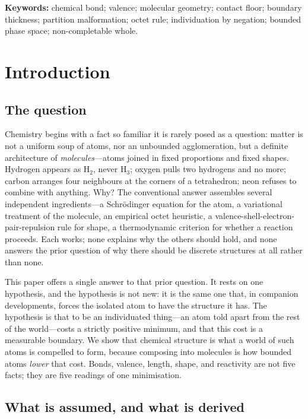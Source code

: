 \documentclass[11pt,twocolumn,a4paper]{article}
\theoremstyle{thmstyle}
\theoremstyle{definition}
\theoremstyle{remark}
\begin{document}
\noindent\textbf{Keywords:} chemical bond; valence; molecular geometry;
contact floor; boundary thickness; partition malformation; octet rule;
individuation by negation; bounded phase space; non-completable whole.

\tableofcontents

\section{Introduction}
\label{sec:intro}

\subsection{The question}

Chemistry begins with a fact so familiar it is rarely posed as a
question: matter is not a uniform soup of atoms, nor an unbounded
agglomeration, but a definite architecture of \emph{molecules}---atoms
joined in fixed proportions and fixed shapes. Hydrogen appears as
H$_2$, never H$_3$; oxygen pulls two hydrogens and no more; carbon
arranges four neighbours at the corners of a tetrahedron; neon refuses
to combine with anything. Why? The conventional answer assembles several
independent ingredients---a Schr\"odinger equation for the atom, a
variational treatment of the molecule, an empirical octet heuristic, a
valence-shell-electron-pair-repulsion rule for shape, a thermodynamic
criterion for whether a reaction proceeds. Each works; none explains why
the others should hold, and none answers the prior question of why there
should be discrete structures at all rather than none.

This paper offers a single answer to that prior question. It rests on
one hypothesis, and the hypothesis is not new: it is the same one that,
in companion developments, forces the isolated atom to have the
structure it has. The hypothesis is that to be an individuated
thing---an atom told apart from the rest of the world---costs a strictly
positive minimum, and that this cost is a measurable boundary. We show
that chemical structure is what a world of such atoms is compelled to
form, because composing into molecules is how bounded atoms
\emph{lower} that cost. Bonds, valence, length, shape, and reactivity
are not five facts; they are five readings of one minimisation.

\subsection{What is assumed, and what is derived}
\end{document}
